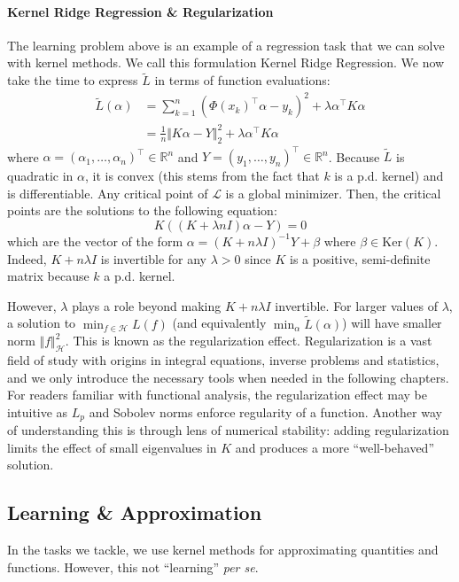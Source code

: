 \paragraph{Kernel Ridge Regression \& Regularization} The learning problem above is an example of a regression task that we can solve with kernel methods. We call this formulation Kernel Ridge Regression. We now take the time to express $\tilde L$ in terms of function evaluations:
\begin{align}
\tilde L(\alpha) &= \sum_{k=1}^n (\Phi(x_k)^\top \alpha - y_k)^2 + \lambda \alpha^\top K\alpha\\
               & = \frac{1}{n}\Vert K\alpha - Y \Vert_2^2 + \lambda \alpha^\top K\alpha
\end{align}
where $\alpha = (\alpha_1, \ldots, \alpha_n)^\top \in\mathbb R^n$ and $Y = (y_1, \ldots, y_n)^\top\in\mathbb R^n$. Because $\tilde L$ is quadratic in $\alpha$, it is convex (this stems from the fact that $k$ is a p.d. kernel) and is differentiable. Any critical point of $\mathcal L$ is a global minimizer. Then, the critical points are the solutions to the following equation:
\begin{equation}
K\left((K + \lambda n I)\alpha - Y\right) = 0
\end{equation}
which are the vector of the form $\alpha = (K + n\lambda I)^{-1}Y + \beta$ where $\beta \in \mathrm{Ker}(K)$. Indeed, $K + n\lambda I$ is invertible for any $\lambda > 0$ since $K$ is a positive, semi-definite matrix because $k$ a p.d. kernel.

However, $\lambda$ plays a role beyond making $K+n\lambda I$ invertible. For larger values of $\lambda$, a solution to $\min_{f\in\mathcal H}L(f)$ (and equivalently $\min_\alpha \tilde L(\alpha)$) will have smaller norm $\Vert f \Vert_\mathcal H^2$. This is known as the regularization effect. Regularization is a vast field of study with origins in integral equations, inverse problems and statistics, and we only introduce the necessary tools when needed in the following chapters. For readers familiar with functional analysis, the regularization effect may be intuitive as $L_p$ and Sobolev norms enforce regularity of a function. Another way of understanding this is through lens of numerical stability: adding regularization limits the effect of small eigenvalues in $K$ and produces a more ``well-behaved'' solution.


\subsection{Learning \& Approximation}
In the tasks we tackle, we use kernel methods for approximating quantities and functions. However, this not ``learning'' \emph{per se}.

